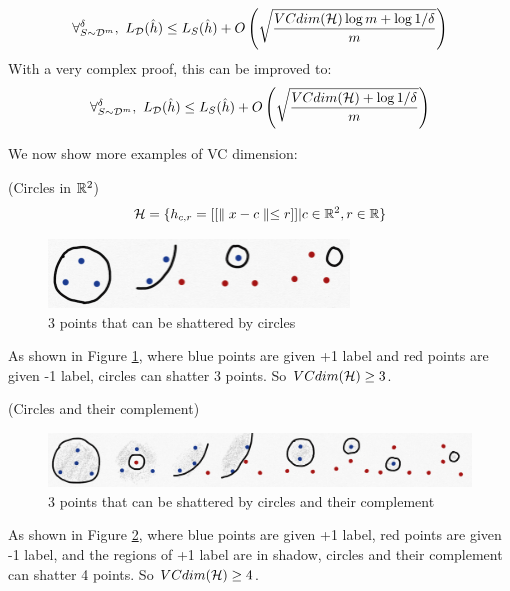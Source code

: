 \documentclass{article}
\begin{document}
\begin{theorem}
\begin{displaymath}
	\forall^\delta_{S\sim\mcD^m},\ L_\mcD(\hat{h}) \leq L_S(\hat{h}) + O\left(\sqrt{\frac{VCdim(\mcH)\log{m}+\log{1/\delta}}{m}}\right)
\end{displaymath}
With a very complex proof, this can be improved to:
\begin{displaymath}
	\forall^\delta_{S\sim\mathcal{D}^m},\ L_{\mathcal{D}}(\hat{h}) \leq L_S(\hat{h}) + O\left(\sqrt{\frac{VCdim(\mathcal{H})+\log{1/\delta}}{m}}\right)
\end{displaymath}
\end{theorem}
We now show more examples of VC dimension:
\begin{example}\label{excircle}(Circles in $\mathbb{R}^2$)
	\begin{displaymath}
		\mathcal{H} = \{h_{c,r}=[[\parallel x-c \parallel\leq r]]| c\in\mathbb{R}^2, r\in \mathbb{R} \}
	\end{displaymath}
  \begin{figure}[H]
  \centering
  \includegraphics[width=80mm]{f4}
  \caption{3 points that can be shattered by circles}\label{f4}
  \end{figure}
	As shown in Figure \ref{f4}, where blue points are given +1 label and red points are given -1 label, circles can shatter 3 points. So $VCdim(\mathcal{H})\geq 3$.
\end{example}

\begin{example}(Circles and their complement)
  \begin{figure}[H]
  \centering
  \includegraphics[width=130mm]{f5}
  \caption{3 points that can be shattered by circles and their complement}\label{f5}
  \end{figure}
	As shown in Figure \ref{f5}, where blue points are given +1 label, red points are given -1 label, and the regions of +1 label are in shadow, circles and their complement can shatter 4 points. So $VCdim(\mathcal{H})\geq 4$.
\end{example}
\end{document}
